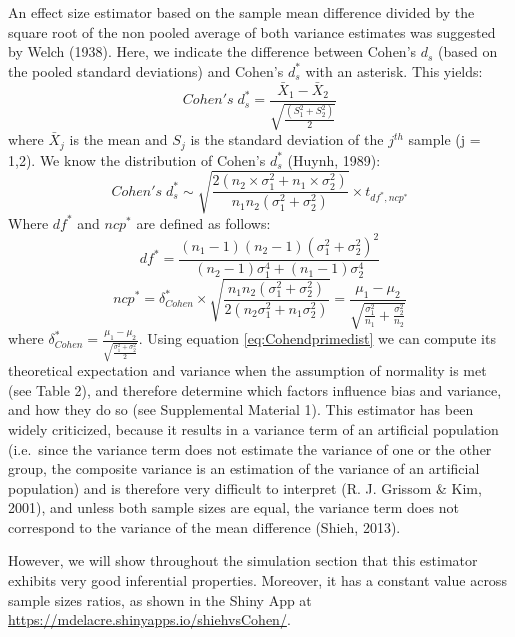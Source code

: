 \documentclass[
  english,
  man,floatsintext]{apa6}
\begin{document}
An effect size estimator based on the sample mean difference divided by the square root of the non pooled average of both variance estimates was suggested by Welch (1938). Here, we indicate the difference between Cohen's \(d_s\) (based on the pooled standard deviations) and Cohen's \(d^*_s\) with an asterisk. This yields:
\begin{equation*} 
Cohen's \; d^*_s = \frac{\bar{X}_{1} - \bar{X}_{2}}{ \sqrt{\frac{\left(S^2_{1}+S^2_{2} \right)}{2}}}
\label{eq:Cohenprimeds}
\end{equation*}
where \(\bar{X}_{j}\) is the mean and \(S_j\) is the standard deviation of the \(j^{th}\) sample (j = 1,2). We know the distribution of Cohen's \(d^*_{s}\) (Huynh, 1989):
\begin{equation} 
Cohen's \; d^*_s \sim  \sqrt{\frac{2(n_2\times\sigma^2_1+n_1\times\sigma^2_2)}{n_1n_2(\sigma^2_1+\sigma^2_2)}} \times t_{df^*,ncp^*}
\label{eq:Cohendprimedist}
\end{equation}
Where \(df^*\) and \(ncp^*\) are defined as follows:
\begin{equation} 
df^* = \frac{(n_1-1)(n_2-1)(\sigma^2_1+\sigma^2_2)^2}{(n_2-1)\sigma^4_1+(n_1-1)\sigma^4_2}
\label{eq:Cohendprimedf}
\end{equation}
\begin{equation*} 
ncp^*=\delta^*_{Cohen} \times \sqrt{\frac{n_1n_2(\sigma^2_1+\sigma^2_2)}{2(n_2\sigma^2_1+n_1\sigma^2_2)}}=\frac{\mu_1-\mu_2}{\sqrt{\frac{\sigma_1^2}{n_1}+\frac{\sigma^2_2}{n_2}}}
\label{eq:Cohendprimevst}
\end{equation*}
where \(\delta^*_{Cohen}=\frac{\mu_1-\mu_2}{\sqrt{\frac{\sigma^2_1+\sigma^2_2}{2}}}\). Using equation \ref{eq:Cohendprimedist} we can compute its theoretical expectation and variance when the assumption of normality is met (see Table 2), and therefore determine which factors influence bias and variance, and how they do so (see Supplemental Material 1). This estimator has been widely criticized, because it results in a variance term of an artificial population (i.e.~since the variance term does not estimate the variance of one or the other group, the composite variance is an estimation of the variance of an artificial population) and is therefore very difficult to interpret (R. J. Grissom \& Kim, 2001), and unless both sample sizes are equal, the variance term does not correspond to the variance of the mean difference (Shieh, 2013).

However, we will show throughout the simulation section that this estimator exhibits very good inferential properties. Moreover, it has a constant value across sample sizes ratios, as shown in the Shiny App at \url{https://mdelacre.shinyapps.io/shiehvsCohen/}.
\end{document}
